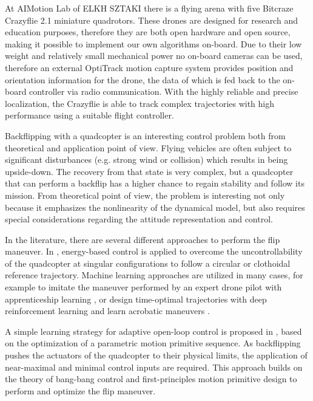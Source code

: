 At AIMotion Lab of ELKH SZTAKI there is a flying arena with five Bitcraze Crazyflie 2.1 miniature quadrotors. These drones are designed for research and education purposes, therefore they are both open hardware and open source, making it possible to implement our own algorithms on-board. Due to their low weight and relatively small mechanical power no on-board cameras can be used, therefore an external OptiTrack motion capture system provides position and orientation information for the drone, the data of which is fed back to the on-board controller via radio communication. With the highly reliable and precise localization, the Crazyflie is able to track complex trajectories with high performance using a suitable flight controller.

Backflipping with a quadcopter is an interesting control problem both from theoretical and application point of view. Flying vehicles are often subject to significant disturbances (e.g. strong wind or collision) which results in being upside-down. The recovery from that state is very complex, but a quadcopter that can perform a backflip has a higher chance to regain stability and follow its mission. From theoretical point of view, the problem is interesting not only because it emphasizes the nonlinearity of the dynamical model, but also requires special considerations regarding the attitude representation and control. 

In the literature, there are several different approaches to perform the flip maneuver. In \cite{energy-quaternion}, energy-based control is applied to overcome the uncontrollability of the quadcopter at singular configurations to follow a circular or clothoidal reference trajectory. Machine learning approaches are utilized in many cases, for example to imitate the maneuver performed by an expert drone pilot with apprenticeship learning \cite{abbeel2010}, or design time-optimal trajectories with deep reinforcement learning \cite{drone-racing-deep-rl} and learn acrobatic maneuvers \cite{deep_acrobatics, quadrotor-control-rl}. 

A simple learning strategy for adaptive open-loop control is proposed in \cite{LSICRA2010}, based on the optimization of a parametric motion primitive sequence. As backflipping pushes the actuators of the quadcopter to their physical limits, the application of near-maximal and minimal control inputs are required. This approach builds on the theory of bang-bang control and first-principles motion primitive design to perform and optimize the flip maneuver. 

